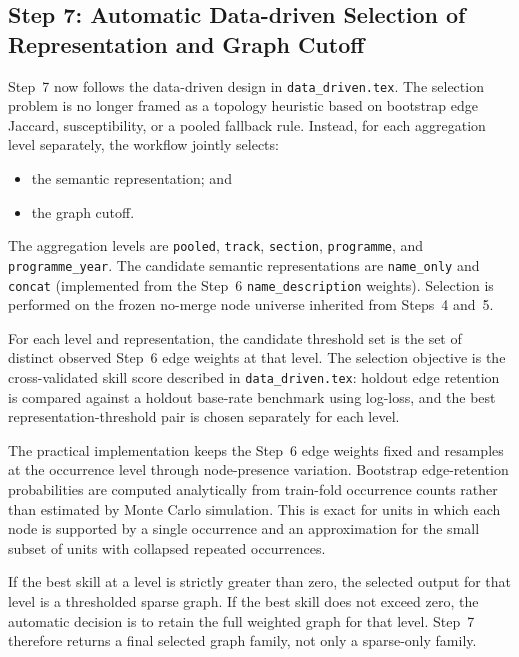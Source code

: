 \subsection{Step 7: Automatic Data-driven Selection of Representation and Graph Cutoff}
\label{sec:step7}

Step~7 now follows the data-driven design in \texttt{data\_driven.tex}. The selection problem is no longer framed as a topology heuristic based on bootstrap edge Jaccard, susceptibility, or a pooled fallback rule. Instead, for each aggregation level separately, the workflow jointly selects:
\begin{itemize}
    \item the semantic representation; and
    \item the graph cutoff.
\end{itemize}

The aggregation levels are \texttt{pooled}, \texttt{track}, \texttt{section}, \texttt{programme}, and \texttt{programme\_year}. The candidate semantic representations are \texttt{name\_only} and \texttt{concat} (implemented from the Step~6 \texttt{name\_description} weights). Selection is performed on the frozen no-merge node universe inherited from Steps~4 and~5.

For each level and representation, the candidate threshold set is the set of distinct observed Step~6 edge weights at that level. The selection objective is the cross-validated skill score described in \texttt{data\_driven.tex}: holdout edge retention is compared against a holdout base-rate benchmark using log-loss, and the best representation-threshold pair is chosen separately for each level.

The practical implementation keeps the Step~6 edge weights fixed and resamples at the occurrence level through node-presence variation. Bootstrap edge-retention probabilities are computed analytically from train-fold occurrence counts rather than estimated by Monte Carlo simulation. This is exact for units in which each node is supported by a single occurrence and an approximation for the small subset of units with collapsed repeated occurrences.

If the best skill at a level is strictly greater than zero, the selected output for that level is a thresholded sparse graph. If the best skill does not exceed zero, the automatic decision is to retain the full weighted graph for that level. Step~7 therefore returns a final selected graph family, not only a sparse-only family.

